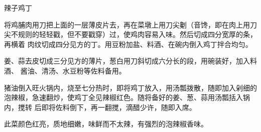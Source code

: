 %
%
%
%
%
%
%
\begin{recipe}{辣子鸡丁}

\ingredients



\preparation

\step 将鸡脯肉用刀把上面的一层薄皮片去，再在菜墩上用刀尖劖（音馋，即在肉上用刀
尖不规则的轻轻戳，但不要戳穿）过，使鸡肉容易入味。然后切成四分宽厚的条，再横着
肉纹切成四分见方的丁。用豆粉加盐、料酒、在碗内倒入鸡丁拌合均匀。

姜、蒜去皮切成三分见方的薄片，葱白用刀斜切成六分长的段，用碗装好，加入料酒、
酱油、清汤、水豆粉等佐料备用。

\step 猪油倒入旺火锅内，烧至七分热时，即将鸡丁放入，用汤瓢拨散，随即加入剁细的
泡辣椒，急速翻炒，使鸡丁全见辣椒红色。随将备好的姜、葱、蒜用汤瓢括入锅内，搅转
后即将佐料倒下，再一翻搅，滴醋少许，随即入席。

\features

此菜颜色红亮，质地细嫩，味鲜而不太辣，有强烈的泡辣椒香味。

\end{recipe}

